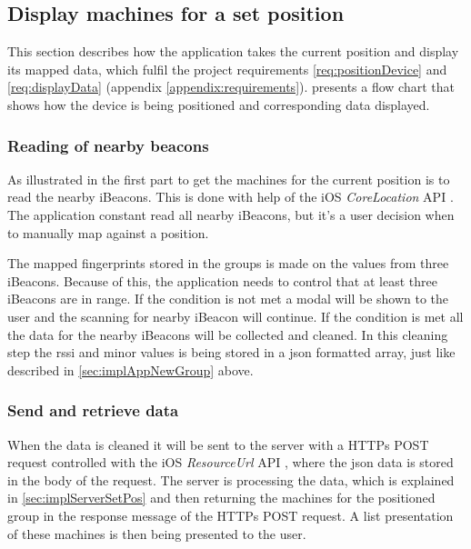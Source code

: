 \subsection{Display machines for a set position}\label{sec:implAppSetPos}
This section describes how the application takes the current position and display its mapped data, which fulfil the project requirements \ref{req:positionDevice} and \ref{req:displayData} (appendix \ref{appendix:requirements}).
 presents a flow chart that shows how the device is being positioned and corresponding data displayed.



\subsubsection{Reading of nearby beacons}\label{sec:implAppSetPosReadBeacons}
As illustrated in  the first part to get the machines for the current position is to read the nearby iBeacons.
This is done with help of the iOS \textit{CoreLocation} API \cite{CoreLocationApple}.
The application constant read all nearby iBeacons, but it's a user decision when to manually map against a position.

\bigskip

The mapped fingerprints stored in the groups is made on the values from three iBeacons.
Because of this, the application needs to control that at least three iBeacons are in range.
If the condition is not met a modal will be shown to the user and the scanning for nearby iBeacon will continue.
If the condition is met all the data for the nearby iBeacons will be collected and cleaned.
In this cleaning step the \acrshort{rssi} and minor values is being stored in a \acrshort{json} formatted array, just like  described in \cref{sec:implAppNewGroup} above.


\subsubsection{Send and retrieve data}\label{sec:implAppSetPosSendRetreiveData}
When the data is cleaned it will be sent to the server with a HTTPs POST request controlled with the iOS \textit{ResourceUrl} API \cite{ResourceURLAppleDeveloper}, where the \acrshort{json} data is stored in the body of the request.
The server is processing the data, which is explained in \cref{sec:implServerSetPos} and then returning the machines for the positioned group in the response message of the HTTPs POST request.
A list presentation of these machines is then being presented to the user.


